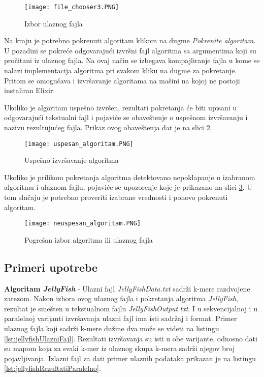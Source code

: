 \documentclass[12pt,oneside]{memoir}
\begin{document}
\begin{figure}[h]
\centering
\texttt{[image: file\_chooser3.PNG]}
\caption{Izbor ulaznog fajla}
\label{fig:fileChooser}
\end{figure}

Na kraju je potrebno pokrenuti algoritam klikom na dugme \textit{Pokrenite algoritam}. U pozadini se pokreće odgovarajući izvršni fajl algoritma sa argumentima koji su pročitani iz ulaznog fajla. Na ovaj način se izbegava kompajliranje fajla u kome se nalazi implementacija algoritma pri svakom kliku na dugme za pokretanje. Pritom se omogućava i izvršavanje algoritama na mašini na kojoj ne postoji instaliran Elixir.

Ukoliko je algoritam uspešno izvršen, rezultati pokretanja će biti upisani u odgovarajući tekstualni fajl i pojaviće se obaveštenje o uspešnom izvršavanju i nazivu rezultujućeg fajla. Prikaz ovog obaveštenja dat je na slici \ref{fig:uspesnoIzvrsavanje}.

\begin{figure}[h]
\centering
\texttt{[image: uspesan\_algoritam.PNG]}
\caption{Uspešno izvršavanje algoritma}
\label{fig:uspesnoIzvrsavanje}
\end{figure}

Ukoliko je prilikom pokretanja algoritma detektovano nepoklapanje u izabranom algoritmu i ulaznom fajlu, pojaviće se upozorenje koje je prikazano na slici \ref{fig:neuspesnoIzvrsavanje}. U tom slučaju je potrebno proveriti izabrane vrednosti i ponovo pokrenuti algoritam.

\begin{figure}[h]
\centering
\texttt{[image: neuspesan\_algoritam.PNG]}
\caption{Pogrešan izbor algoritma ili ulaznog fajla}
\label{fig:neuspesnoIzvrsavanje}
\end{figure}

\subsection{Primeri upotrebe}

\textbf{Algoritam \textit{JellyFish}} - Ulazni fajl \textit{JellyFishData.txt} sadrži k-mere razdvojene zarezom. Nakon izbora ovog ulaznog fajla i pokretanja algoritma \textit{JellyFish}, rezultat je smešten u tekstualnom fajlu \textit{JellyFishOutput.txt}. I u sekvencijalnoj i u paralelnoj varijanti izvršavanja ulazni fajl ima isti sadržaj i format. Primer ulaznog fajla koji sadrži k-mere dužine dva može se videti na listingu \ref{lst:jellyfishUlazniFajl}. Rezultati izvršavanja su isti u obe varijante, odnosno dati su mapom koja za svaki k-mer iz ulaznog skupa k-mera sadrži njegov broj pojavljivanja. Izlazni fajl za dati primer ulaznih podataka prikazan je na listingu \ref{lst:jellyfishRezultatiParalelno}.
\end{document}
